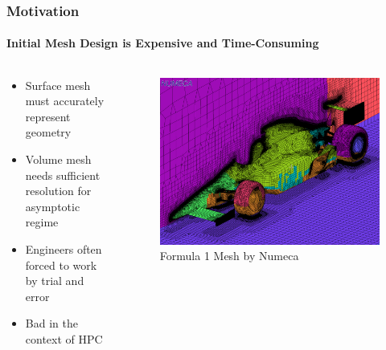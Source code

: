 \documentclass[18pt,xcolor=table]{beamer}
\begin{document}
\begin{frame}[t]
\frametitle{Motivation}
\framesubtitle{Initial Mesh Design is Expensive and Time-Consuming}
\begin{columns}[t]
\begin{column}[c]{0.4\textwidth}
\begin{itemize}
  \item Surface mesh must accurately represent geometry
  \item Volume mesh needs sufficient resolution for asymptotic regime
  \item Engineers often forced to work by trial and error
  \item Bad in the context of HPC
\end{itemize}
\end{column}
\begin{column}[c]{0.6\textwidth}
\vspace{2ex}
\begin{figure}[t]
\centering
\includegraphics[width=1.0\textwidth]{Motivation/NumecaRaceCar.png}
\\\small{Formula 1 Mesh by Numeca}\\
\end{figure}
\end{column}
\end{columns}
\end{frame}
\end{document}
